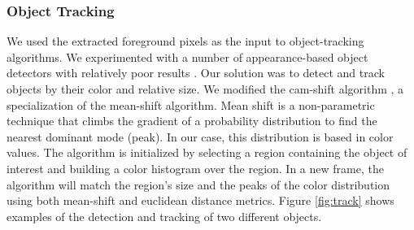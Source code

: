 \documentclass[10pt,letterpaper]{article}
\begin{document}

\subsubsection{Object Tracking}

We used the extracted foreground pixels as the input to object-tracking algorithms. 
We experimented with a number of appearance-based object detectors with relatively poor results \cite{TLD}. Our solution was to detect and track objects by their color and relative size. We modified the cam-shift algorithm \cite{bradsky}, a specialization of the mean-shift algorithm.
Mean shift is a non-parametric technique that climbs the gradient of a probability distribution to find the nearest dominant mode (peak). In our case, this distribution is based in color values. The algorithm is initialized by selecting a region containing the object of interest and building a color histogram over the region. In a new frame, the algorithm will match the region's size and the peaks of the color distribution using both mean-shift and euclidean distance metrics. Figure \ref{fig:track} shows examples of the detection and tracking of two different objects.
\end{document}
